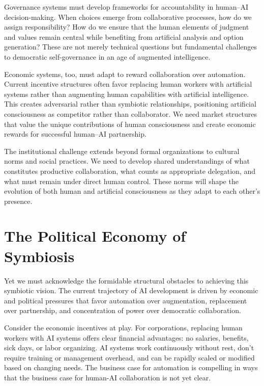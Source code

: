 Governance systems must develop frameworks for accountability in human–AI decision-making. When choices emerge from collaborative processes, how do we assign responsibility? How do we ensure that the human elements of judgment and values remain central while benefiting from artificial analysis and option generation? These are not merely technical questions but fundamental challenges to democratic self-governance in an age of augmented intelligence.

Economic systems, too, must adapt to reward collaboration over automation. Current incentive structures often favor replacing human workers with artificial systems rather than augmenting human capabilities with artificial intelligence. This creates adversarial rather than symbiotic relationships, positioning artificial consciousness as competitor rather than collaborator. We need market structures that value the unique contributions of human consciousness and create economic rewards for successful human–AI partnership.

The institutional challenge extends beyond formal organizations to cultural norms and social practices. We need to develop shared understandings of what constitutes productive collaboration, what counts as appropriate delegation, and what must remain under direct human control. These norms will shape the evolution of both human and artificial consciousness as they adapt to each other's presence.

\section{The Political Economy of Symbiosis}

Yet we must acknowledge the formidable structural obstacles to achieving this symbiotic vision. The current trajectory of AI development is driven by economic and political pressures that favor automation over augmentation, replacement over partnership, and concentration of power over democratic collaboration.

Consider the economic incentives at play. For corporations, replacing human workers with AI systems offers clear financial advantages: no salaries, benefits, sick days, or labor organizing. AI systems work continuously without rest, don't require training or management overhead, and can be rapidly scaled or modified based on changing needs. The business case for automation is compelling in ways that the business case for human-AI collaboration is not yet clear.

